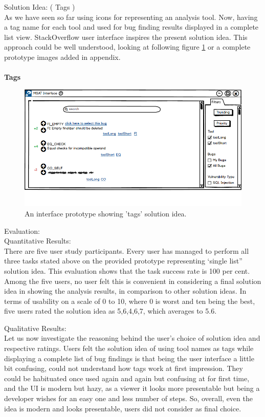 Solution Idea: ( Tags ) \\

As we have seen so far using icons for representing an analysis tool. Now, having a tag name for each tool and used for bug finding results displayed in a complete list view. StackOverflow user interface inspires the present solution idea. This approach could be well understood, looking at following figure \ref{fig:S11_tags} or a complete prototype images added in appendix. 
\\ \\

\textbf{Tags}
\begin{figure}[hbt!]
	\centering
	\includegraphics[width=\linewidth]{figures/solution_ideas_snaps/S11_tags}
	\caption{An interface prototype showing 'tags' solution idea.}
	\label{fig:S11_tags}
\end{figure}

Evaluation: \\

Quantitative Results: \\

There are five user study participants. Every user has managed to perform all three tasks stated above on the provided prototype representing ‘single list” solution idea. This evaluation shows that the task success rate is 100 per cent.
Among the five users, no user felt this is convenient in considering a final solution idea in showing the analysis results, in comparison to other solution ideas.  In terms of usability on a scale of 0 to 10, where 0 is worst and ten being the best, five users rated the solution idea as 5,6,4,6,7, which averages to 5.6. 

Qualitative Results: \\

Let us now investigate the reasoning behind the user’s choice of solution idea and respective ratings. Users felt the solution idea of using tool names as tags while displaying a complete list of bug findings is that being the user interface a little bit confusing, could not understand how tags work at first impression. They could be habituated once used again and again but confusing at for first time, and the UI is modern but hazy, as a viewer it looks more presentable but being a developer wishes for an easy one and less number of steps. So, overall, even the idea is modern and looks presentable, users did not consider as final choice. \\ \\



